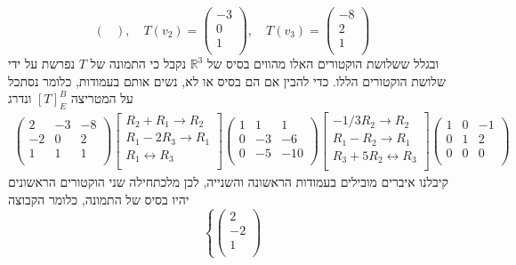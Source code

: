 \documentclass[12pt, a4paper]{article}
\newcommand{\rr}{\mathbb{R}}
\begin{document}
\begin{enumerate}
\begin{enumerate}
$$\begin{pmatrix}
\end{pmatrix},\quad T(v_2)=\begin{pmatrix}
    -3\\0\\1\\
\end{pmatrix},\quad T(v_3)=\begin{pmatrix}
    -8\\2\\1\\
\end{pmatrix}$$
ובגלל ששלושת הוקטורים האלו מהווים בסיס של
$\rr^3$
נקבל כי
התמונה של
$T$
נפרשת על ידי שלושת הוקטורים הללו. כדי להבין אם הם בסיס או לא, נשים אותם בעמודות, כלומר נסתכל על המטריצה
$[T]_E^B$
ונדרג
\begin{align*}\begin{pmatrix}
    2&-3&-8\\
    -2&0&2\\
    1&1&1\\
\end{pmatrix}
\begin{bmatrix}
R_2+R_1\rightarrow R_2\\
    R_1-2R_3\rightarrow R_1\\
    R_1\leftrightarrow R_3\\
\end{bmatrix}
\begin{pmatrix}
1&1&1\\
    0&-3&-6\\
        0&-5&-10\\
\end{pmatrix}
\begin{bmatrix}
-1/3R_2\rightarrow R_2\\
    R_1-R_2\rightarrow R_1\\
    R_3+5R_2\leftrightarrow R_3\\
\end{bmatrix}
\begin{pmatrix}
1&0&-1\\
    0&1&2\\
        0&0&0\\
\end{pmatrix}
\end{align*}
קיבלנו איברים מובילים בעמודות הראשונה והשנייה, לכן מלכתחילה שני הוקטורים הראשונים יהיו בסיס של התמונה, כלומר הקבוצה
$$\left\{
\begin{pmatrix}
    2\\-2\\1\\

\end{pmatrix}$$
\end{enumerate}
\end{enumerate}
\end{document}
